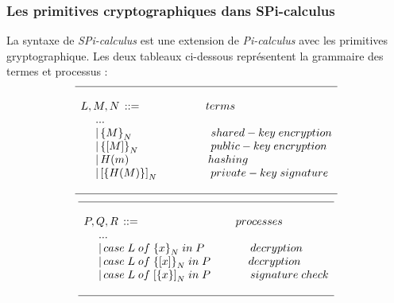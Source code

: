\documentclass[10pt,a4paper]{article}
\begin{document}
\subsubsection{Les primitives cryptographiques dans SPi-calculus}
La syntaxe de \textit{SPi-calculus} est une extension de \textit{Pi-calculus} avec les primitives gryptographique. Les deux tableaux ci-dessous représentent la grammaire des termes et processus : 	
\[
\begin{array}{l}
\hline
\\
L,M,N\, ::=\hspace{2cm}terms\\
\,\,\,\,\,\,\,\,...\hspace{3.1cm}\\
\,\,\,\,\,\,\,\,\vert\,{\lbrace M\rbrace}_{N}\hspace{2.5cm}shared-key\; encryption\\
\,\,\,\,\,\,\,\,\vert\,{\lbrace [M]\rbrace}_{N}\hspace{2.3cm}public-key\;encryption\\
\,\,\,\,\,\,\,\,\vert\,H(m)\hspace{2.5cm}hashing\\
\,\,\,\,\,\,\,\,\vert\,{[\lbrace H(M)\rbrace]}_{N} \hspace{1.7cm}private-key\;signature\\
\\
\hline
\end{array}
\]
\[
\begin{array}{l}
\hline
\\
P,Q,R\, ::=\hspace{3cm}processes\\
\,\,\,\,\,\,\,\,...\hspace{4cm}\\
\,\,\,\,\,\,\,\,\vert\,case\;L\;of\;{\lbrace x\rbrace}_{N}\;in\;P\hspace{1.4cm}\,decryption \\
\,\,\,\,\,\,\,\,\vert\,case\;L\;of\;{\lbrace[x]\rbrace}_{N}\;in\;P\hspace{1.2cm}decryption \\
\,\,\,\,\,\,\,\,\vert\,case\;L\;of\;{[\lbrace x\rbrace]}_{N}\;in\;P\hspace{1.2cm}\,signature\;check \\
\\
\hline
\end{array}
\]
\end{document}

